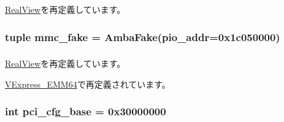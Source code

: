 \hyperlink{classRealView_1_1RealView_affd713b1717e14a6268fd6dd5c1c695f}{RealView}を再定義しています。\hypertarget{classRealView_1_1VExpress__EMM_aea1f4d5125bc4930882b7415e32696dc}{
\subsubsection[{mmc\_\-fake}]{\setlength{\rightskip}{0pt plus 5cm}tuple {\bf mmc\_\-fake} = {\bf AmbaFake}(pio\_\-addr=0x1c050000)}}
\label{classRealView_1_1VExpress__EMM_aea1f4d5125bc4930882b7415e32696dc}
\hypertarget{classRealView_1_1VExpress__EMM_abcf52781f9ca2926e1f879ceecb4865c}{
\subsubsection[{nvmem}]{}}
\label{classRealView_1_1VExpress__EMM_abcf52781f9ca2926e1f879ceecb4865c}


\hyperlink{classRealView_1_1RealView_abcf52781f9ca2926e1f879ceecb4865c}{RealView}を再定義しています。

\hyperlink{classRealView_1_1VExpress__EMM64_abcf52781f9ca2926e1f879ceecb4865c}{VExpress\_\-EMM64}で再定義されています。\hypertarget{classRealView_1_1VExpress__EMM_a414ad47615ab498f1da72365f610ff63}{
\subsubsection[{pci\_\-cfg\_\-base}]{\setlength{\rightskip}{0pt plus 5cm}int {\bf pci\_\-cfg\_\-base} = 0x30000000}}
\label{classRealView_1_1VExpress__EMM_a414ad47615ab498f1da72365f610ff63}


